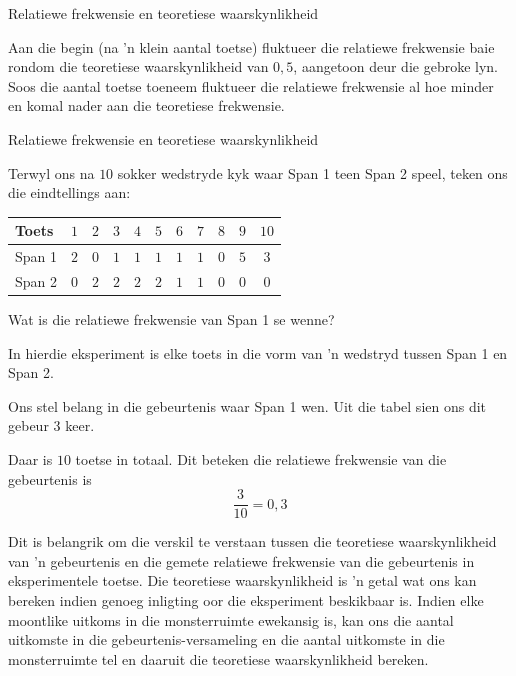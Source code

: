 \begin{wex}{Relatiewe frekwensie en teoretiese waarskynlikheid}
{Aan die begin (na 'n klein aantal toetse) fluktueer die relatiewe frekwensie baie rondom die teoretiese waarskynlikheid van $0,5$, aangetoon deur die gebroke lyn. Soos die aantal toetse toeneem fluktueer die relatiewe frekwensie al hoe minder en komal nader aan die teoretiese frekwensie.


}
\end{wex}


\begin{wex}{Relatiewe frekwensie en teoretiese waarskynlikheid}{
  Terwyl ons na $10$ sokker wedstryde kyk waar Span 1 teen Span 2 speel, teken ons die eindtellings aan:
    \begin{center}
      \begin{tabular}{lcccccccccc}
        \toprule
        Toets  & $1$ & $2$ & $3$ & $4$ & $5$ & $6$ & $7$ & $8$ & $9$ & $10$ \\
        \midrule
        Span 1 & $2$ & $0$ & $1$ & $1$ & $1$ & $1$ & $1$ & $0$ & $5$ & $3$ \\
        Span 2 & $0$ & $2$ & $2$ & $2$ & $2$ & $1$ & $1$ & $0$ & $0$ & $0$ \\
        \bottomrule
      \end{tabular}
    \end{center}
  Wat is die relatiewe frekwensie van Span 1 se wenne?
}{
  In hierdie eksperiment is elke toets in die vorm van 'n wedstryd tussen Span 1 en Span 2.


  Ons stel belang in die gebeurtenis waar Span 1 wen. Uit die tabel sien ons dit gebeur $3$ keer.


  Daar is $10$ toetse in totaal. Dit beteken die relatiewe frekwensie van die gebeurtenis is \[\frac{3}{10} = 0,3\]
}
\end{wex}

Dit is belangrik om die verskil te verstaan tussen die teoretiese waarskynlikheid van 'n gebeurtenis en die gemete relatiewe frekwensie van die gebeurtenis in eksperimentele toetse. Die teoretiese waarskynlikheid is 'n getal wat ons kan bereken indien genoeg inligting oor die eksperiment beskikbaar is. Indien elke moontlike uitkoms in die monsterruimte ewekansig is, kan ons die aantal uitkomste in die gebeurtenis-versameling en die aantal uitkomste in die monsterruimte tel en daaruit die teoretiese waarskynlikheid bereken.\par

